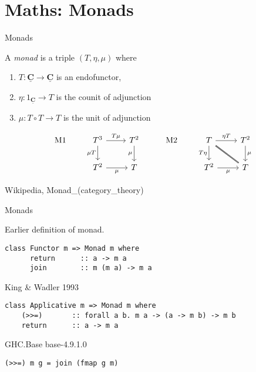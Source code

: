 \documentclass[10pt]{beamer}
\newcommand{\Cat}[1]{\ensuremath{\underline{\mathbf{#1}}}}
\theoremstyle{definition}
\theoremstyle{remark}
\numberwithin{equation}{section}
\begin{document}
\section{Maths: Monads}

\begin{frame}[fragile]{Monads}

  A \emph{monad} is a triple $(T,\eta,\mu)$ where
  \begin{enumerate}
  \item $T: \Cat{C}\to \Cat{C}$ is an endofunctor,
  \item $\eta: 1_{\Cat{C}} \to T$ is the counit of adjunction
  \item $\mu: T \circ T \rightarrow T$ is the unit of adjunction
  \end{enumerate}

  \[
  \begin{tikzcd}
    \mathrm{M1} & T^3 \arrow{d}[swap]{\mu T}\arrow{r}{T\mu}  & T^2 \arrow{d}[swap]{\mu} &
    \mathrm{M2} & T \arrow{d}[swap]{T\eta}\arrow{r}{\eta T}\arrow[dash,double]{dr} & T^2 \arrow{d}{\mu} \\
    & T^2 \arrow{r}[swap]{\mu} & T & & T^2 \arrow{r}[swap]{\mu} & T
  \end{tikzcd}
  \]

  {\small Wikipedia, Monad\_(category\_theory)}
  
\end{frame}

\begin{frame}[fragile]{Monads}

  Earlier definition of monad.
  
  \begin{lstlisting}[frame=single]
    class Functor m => Monad m where
      return      :: a -> m a
      join        :: m (m a) -> m a
  \end{lstlisting}

  {\small King \& Wadler 1993}
  
  \begin{lstlisting}[frame=single]
    class Applicative m => Monad m where
    (>>=)       :: forall a b. m a -> (a -> m b) -> m b
    return      :: a -> m a
  \end{lstlisting}

  {\small GHC.Base base-4.9.1.0}

  \begin{lstlisting}[frame=single]
    (>>=) m g = join (fmap g m)
  \end{lstlisting}

\end{frame}
\end{document}

